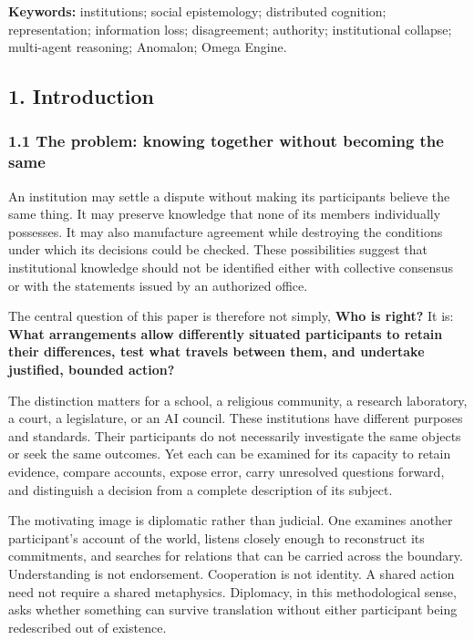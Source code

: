 \documentclass[
  10pt,
]{article}
\begin{document}
\textbf{Keywords:} institutions; social epistemology; distributed cognition; representation; information loss; disagreement; authority; institutional collapse; multi-agent reasoning; Anomalon; Omega Engine.

\subsection{1. Introduction}\label{introduction}

\subsubsection{1.1 The problem: knowing together without becoming the same}\label{the-problem-knowing-together-without-becoming-the-same}

An institution may settle a dispute without making its participants believe the same thing. It may preserve knowledge that none of its members individually possesses. It may also manufacture agreement while destroying the conditions under which its decisions could be checked. These possibilities suggest that institutional knowledge should not be identified either with collective consensus or with the statements issued by an authorized office.

The central question of this paper is therefore not simply, \textbf{Who is right?} It is: \textbf{What arrangements allow differently situated participants to retain their differences, test what travels between them, and undertake justified, bounded action?}

The distinction matters for a school, a religious community, a research laboratory, a court, a legislature, or an AI council. These institutions have different purposes and standards. Their participants do not necessarily investigate the same objects or seek the same outcomes. Yet each can be examined for its capacity to retain evidence, compare accounts, expose error, carry unresolved questions forward, and distinguish a decision from a complete description of its subject.

The motivating image is diplomatic rather than judicial. One examines another participant's account of the world, listens closely enough to reconstruct its commitments, and searches for relations that can be carried across the boundary. Understanding is not endorsement. Cooperation is not identity. A shared action need not require a shared metaphysics. Diplomacy, in this methodological sense, asks whether something can survive translation without either participant being redescribed out of existence.
\end{document}

